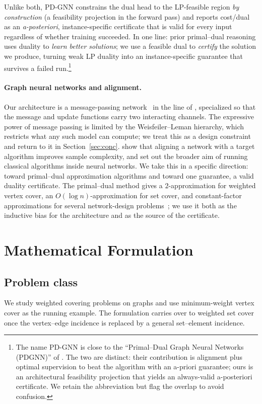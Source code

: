 \documentclass[11pt]{article}
\theoremstyle{plain}
\theoremstyle{definition}
\theoremstyle{remark}
\newcommand{\PDGNN}{\textsc{PD-GNN}}
\begin{document}
Unlike both, \PDGNN{} constrains the dual head to the LP-feasible region
\emph{by construction} (a feasibility projection in the forward pass) and reports
cost/dual as an \emph{a-posteriori}, instance-specific certificate that is valid
for every input regardless of whether training succeeded. In one line: prior
primal--dual reasoning uses duality to \emph{learn better solutions}; we use a
feasible dual to \emph{certify} the solution we produce, turning weak LP duality
into an instance-specific guarantee that survives a failed run.\footnote{The
name \PDGNN{} is close to the ``Primal--Dual Graph Neural Networks (PDGNN)'' of
\citet{he2025primal}. The two are distinct: their contribution is alignment plus
optimal supervision to beat the algorithm with an a-priori guarantee; ours is an
architectural feasibility projection that yields an always-valid a-posteriori
certificate. We retain the abbreviation but flag the overlap to avoid confusion.}

\paragraph{Graph neural networks and alignment.}
Our architecture is a message-passing network~\citep{gilmer2017neural} in the
line of \citet{kipf2017semi}, specialized so that the message and update
functions carry two interacting channels. The expressive power of message
passing is limited by the Weisfeiler--Leman hierarchy, which restricts what any
such model can compute; we treat this as a design constraint and return to it in
Section~\ref{sec:conc}. \citet{xu2020what} show that aligning a network with a
target algorithm improves sample complexity, and \citet{velivckovic2021neural}
set out the broader aim of running classical algorithms inside neural networks.
We take this in a specific direction: toward primal--dual approximation
algorithms and toward one guarantee, a valid duality certificate. The
primal--dual method gives a $2$-approximation for weighted vertex cover, an
$O(\log n)$-approximation for set cover, and constant-factor approximations for
several network-design problems~\citep{williamson2011design}; we use it both as
the inductive bias for the architecture and as the source of the certificate.

\section{Mathematical Formulation}\label{sec:form}

\subsection{Problem class}
We study weighted covering problems on graphs and use minimum-weight vertex
cover as the running example. The formulation carries over to weighted set cover
once the vertex--edge incidence is replaced by a general set--element incidence.
\end{document}
